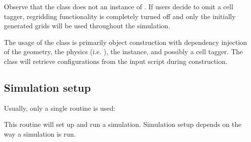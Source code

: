 \documentclass[letterpaper,10pt,english]{sphinxmanual}
\begin{document}
Observe that the  class does not  an instance of {\hyperref[\detokenize{Source/CellTagger:chap-celltagger}]{}}.
If users decide to omit a cell tagger, regridding functionality is completely turned off and only the initially generated grids will be used throughout the simulation.

The usage of the  class is primarily object construction with dependency injection of the geometry, the physics (i.e. ), the  instance, and possibly a cell tagger.
The  class will retrieve configurations from the input script during construction.


\subsection{Simulation setup}
\label{\detokenize{Source/Driver:simulation-setup}}
Usually, only a single routine is used:

\begin{sphinxVerbatim}[commandchars=\\\{\},formatcom=\scriptsize]
   
\end{sphinxVerbatim}

This routine will set up and run a simulation.
Simulation setup depends on the way a simulation is run.
\end{document}
